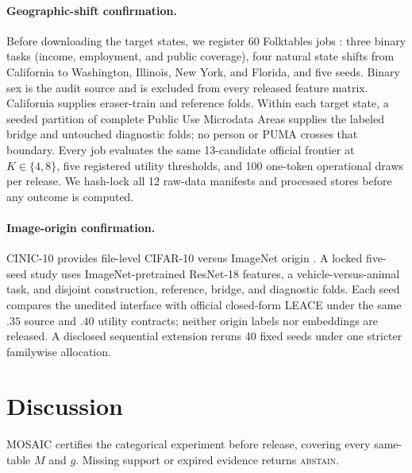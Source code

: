 \paragraph{Geographic-shift confirmation.}
Before downloading the target states, we register 60 Folktables jobs
\citep{ding2021folktables}: three binary tasks (income, employment, and public
coverage), four natural state shifts from California to Washington, Illinois,
New York, and Florida, and five seeds. Binary sex is the audit source and is
excluded from every released feature matrix. California supplies eraser-train
and reference folds. Within each target state, a seeded partition of complete
Public Use Microdata Areas supplies the labeled bridge and untouched diagnostic
folds; no person or PUMA crosses that boundary. Every job evaluates the same
13-candidate official frontier at $K\in\{4,8\}$, five registered utility
thresholds, and 100 one-token operational draws per release. We hash-lock all
12 raw-data manifests and processed stores before any outcome is computed.

\paragraph{Image-origin confirmation.}
CINIC-10 provides file-level CIFAR-10 versus ImageNet origin
\citep{darlow2018cinic}. A locked five-seed study uses ImageNet-pretrained
ResNet-18 features, a vehicle-versus-animal task, and disjoint construction,
reference, bridge, and diagnostic folds. Each seed compares the unedited
interface with official closed-form LEACE under the same $.35$ source and
$.40$ utility contracts; neither origin labels nor embeddings are released. A
disclosed sequential extension reruns 40 fixed seeds under one stricter
familywise allocation.





\section{Discussion}

MOSAIC certifies the categorical experiment before release, covering every
same-table $M$ and $g$. Missing support or expired evidence returns
\textsc{abstain}.
